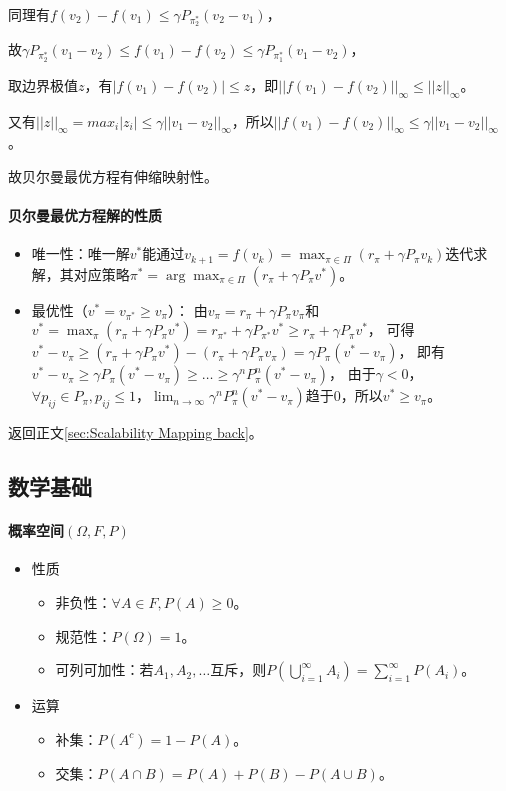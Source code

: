 \documentclass[
12pt, %
a4paper, 
oneside, %
headinclude,footinclude, %
]{scrartcl}
\begin{document}
同理有$ f(v_2) - f(v_1) \leq \gamma P_{\pi_2^*} (v_2 - v_1) $，

故$ \gamma P_{\pi_2^*} (v_1 - v_2)\leq f(v_1) - f(v_2) \leq \gamma P_{\pi_1^*} (v_1 - v_2) $，

取边界极值$ z $，有$ |f(v_1) - f(v_2)| \leq z $，即$ ||f(v_1) - f(v_2)||_\infty \leq ||z||_\infty $。

又有$ ||z||_\infty = max_i |z_i| \leq \gamma ||v_1 - v_2||_\infty $，所以$ ||f(v_1) - f(v_2)||_\infty \leq \gamma ||v_1 - v_2||_\infty $。

故贝尔曼最优方程有伸缩映射性。
\paragraph{贝尔曼最优方程解的性质}
\begin{itemize}
\item 唯一性：唯一解$ v^* $能通过$ v_{k + 1} = f(v_k) = \max_{\pi \in \Pi} (r_\pi + \gamma P_\pi v_k) $迭代求解，其对应策略$ \pi^* = \arg \max_{\pi \in \Pi} (r_\pi + \gamma P_\pi v^*) $。
\item 最优性（$ v^* = v_{\pi^*} \geq v_{\pi} $）：
由$ v_{\pi} = r_{\pi} + \gamma P_{\pi} v_{\pi} $和$ v^* = \max_{\pi} (r_{\pi} + \gamma P_{\pi} v^*) = r_{\pi^*} + \gamma P_{\pi^*} v^* \geq r_{\pi} + \gamma P_{\pi} v^* $，
可得$ v^* - v_{\pi} \geq (r_{\pi} + \gamma P_{\pi} v^*) - (r_{\pi} + \gamma P_{\pi} v_{\pi}) = \gamma P_{\pi} (v^* - v_{\pi}) $，
即有$ v^* - v_{\pi} \geq \gamma P_{\pi} (v^* - v_{\pi}) \geq \dots \geq \gamma^n P_{\pi}^n (v^* - v_{\pi}) $，
由于$ \gamma < 0 $，$ \forall p_{ij} \in P_{\pi}, p_{ij} \leq 1 $，$ \lim_{n \to \infty} \gamma^n P_{\pi}^n (v^* - v_{\pi}) $趋于0，所以$ v^* \geq v_{\pi} $。
\end{itemize}

返回正文\ref{sec:Scalability Mapping back}。
\subsection{数学基础}
\paragraph*{概率空间$ (\Omega, F, P) $}
\begin{itemize}
\item 性质
\begin{itemize}
\item 非负性：$ \forall A \in F,P(A) \geq 0 $。
\item 规范性：$ P(\Omega) = 1 $。
\item 可列可加性：若$ A_1, A_2, \dots $互斥，则$ P(\bigcup_{i = 1}^{\infty} A_i) = \sum_{i = 1}^{\infty} P(A_i) $。
\end{itemize}
\item 运算
\begin{itemize}
\item 补集：$ P(A^c) = 1 - P(A) $。
\item 交集：$ P(A \cap B) = P(A) + P(B) - P(A \cup B) $。
\end{itemize}
\end{itemize}
\end{document}

